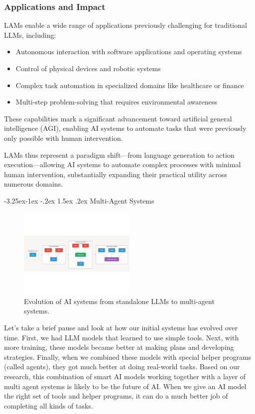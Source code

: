 \documentclass[journal,twoside,10pt]{IEEEtran}
\makeatletter
\renewcommand\subsection{\@startsection{subsection}{2}{\z@}%
                       {-3.25ex\@plus -1ex \@minus -.2ex}%
                       {1.5ex \@plus .2ex}%
                       {\normalfont\large\bfseries}}
\makeatother
\begin{document}
\subsubsection{Applications and Impact}
LAMs enable a wide range of applications previously challenging for traditional LLMs, including:

\begin{itemize}
    \item Autonomous interaction with software applications and operating systems
    \item Control of physical devices and robotic systems
    \item Complex task automation in specialized domains like healthcare or finance
    \item Multi-step problem-solving that requires environmental awareness
\end{itemize}

These capabilities mark a significant advancement toward artificial general intelligence (AGI), enabling AI systems to automate tasks that were previously only possible with human intervention.

LAMs thus represent a paradigm shift—from language generation to action execution—allowing AI systems to automate complex processes with minimal human intervention, substantially expanding their practical utility across numerous domains.

\subsection{Multi-Agent Systems}

\begin{figure}[htbp]
    \centering
    \includegraphics[width=0.5\textwidth, trim=0 150pt 0 150pt, clip]{lams_diagram.pdf}
    \caption{Evolution of AI systems from standalone LLMs to multi-agent systems.}
    \label{fig:lam-evolution}
\end{figure}

Let's take a brief pause and look at how our initial systems has evolved over time. First, we had LLM models that learned to use simple tools. Next, with more training, these models became better at making plans and developing strategies. Finally, when we combined these models with special helper programs (called agents), they got much better at doing real-world tasks. Based on our research, this combination of smart AI models working together with a layer of multi agent systems is likely to be the future of AI. When we give an AI model the right set of tools and helper programs, it can do a much better job of completing all kinds of tasks. 
\end{document}
